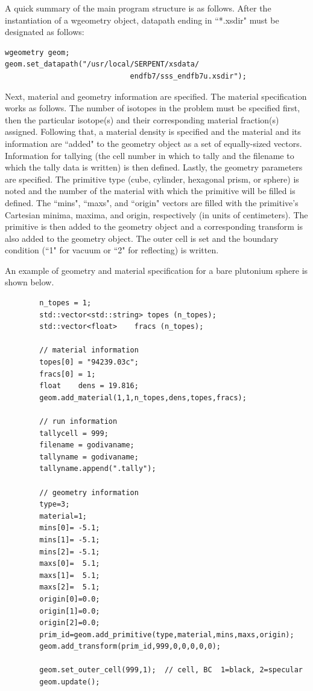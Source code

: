 \documentclass[twoside,a4paper]{refart}
\begin{document}
A quick summary of the main program structure is as follows.  After the instantiation of a wgeometry object, datapath ending in ``*.xsdir" must be designated as follows:

\begin{verbatim}
wgeometry geom;
geom.set_datapath("/usr/local/SERPENT/xsdata/
                             endfb7/sss_endfb7u.xsdir");
\end{verbatim}

Next, material and geometry information are specified. The material specification works as follows. The 
number of isotopes in the problem must be specified first, then the particular isotope(s) and their 
corresponding material fraction(s) assigned. Following that, a material density is specified and the 
material and its information are ``added" to the geometry object as a set of equally-sized vectors. Information for tallying (the cell number in which to tally and the filename to which the tally data is written) is then defined.  Lastly, the geometry parameters are specified. The primitive type (cube, cylinder, hexagonal prism, or sphere) is noted and the number of the material with which the primitive will be filled is defined. The ``mins", ``maxs", and ``origin" vectors are filled with the primitive's Cartesian minima, maxima, and origin, respectively (in units of centimeters). The primitive is then added to the geometry object and a corresponding transform is also added to the geometry object. The outer cell is set and the boundary condition (``1" for vacuum or ``2" for reflecting) is written.

An example of geometry and material specification for a bare plutonium sphere is shown below.

\begin{verbatim}
		n_topes = 1;
		std::vector<std::string> topes (n_topes);
		std::vector<float>    fracs (n_topes);

		// material information
		topes[0] = "94239.03c";
		fracs[0] = 1;      
		float    dens = 19.816;
		geom.add_material(1,1,n_topes,dens,topes,fracs);
		
		// run information
		tallycell = 999;
		filename = godivaname;
		tallyname = godivaname;
		tallyname.append(".tally");
	
		// geometry information
		type=3;
		material=1;
		mins[0]= -5.1;
		mins[1]= -5.1;
		mins[2]= -5.1;
		maxs[0]=  5.1;
		maxs[1]=  5.1;
		maxs[2]=  5.1;
		origin[0]=0.0;
		origin[1]=0.0;
		origin[2]=0.0;
		prim_id=geom.add_primitive(type,material,mins,maxs,origin);
		geom.add_transform(prim_id,999,0,0,0,0,0);

		geom.set_outer_cell(999,1);  // cell, BC  1=black, 2=specular
		geom.update();
\end{verbatim}
\end{document}
